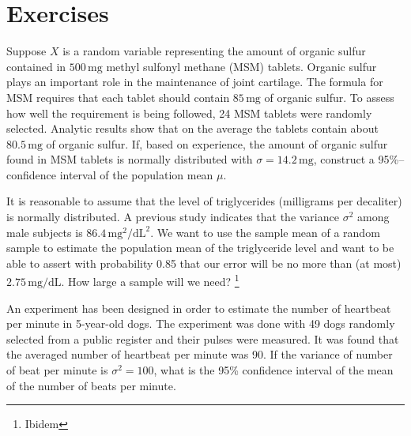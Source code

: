 
\section{Exercises}
\label{ch4Exercises}
\begin{problem} %
Suppose $X$ is a random variable representing the amount of organic
sulfur contained in $500\,\textrm{mg}$ methyl sulfonyl methane (MSM)
tablets. Organic sulfur plays an important role in the maintenance of
joint cartilage. The formula for MSM requires that each tablet should
contain $85\,\textrm{mg}$ of organic sulfur. To assess how well the
requirement is being followed,  24 MSM tablets were randomly
selected.
Analytic results show that on the average the tablets contain about
$80.5\,\textrm{mg}$ of organic sulfur.
If, based on experience, the amount of organic sulfur found in MSM
tablets is normally distributed with $\sigma = 14.2 \,\textrm{mg}$,
 construct a 95\%--confidence interval of the  population mean $\mu$. 
\end{problem}



\begin{problem} %
 It is reasonable to assume that the level of triglycerides
 (milligrams per decaliter) is normally distributed. A previous study
 indicates that the variance $\sigma^2$ among male subjects is
 $86.4\,\textrm{mg}^2/\textrm{dL}^2$. We want to use the sample mean of a random sample to estimate
 the population mean of
the triglyceride level and want to be able to assert with probability
0.85 that our error will be no more than (at most) $2.75\,\textrm{mg/dL}$. How
large a sample will we need? \footnote{Ibidem}
\end{problem}


\begin{problem}
  An experiment has been designed in order to estimate the number of
  heartbeat per minute in 5-year-old dogs. The experiment was done
  with 49 dogs randomly selected from a public register and their
  pulses were measured. It was found that the averaged number of
  heartbeat per minute was 90. If the variance of number of beat per minute is $\sigma^2 = 100$, what is the 95\% confidence interval of the mean of the number of beats per minute.
\end{problem}


